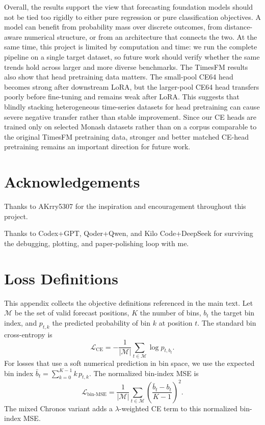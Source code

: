 \documentclass{article}
\begin{document}
Overall, the results support the view that forecasting foundation models should
not be tied too rigidly to either pure regression or pure classification
objectives.  A model can benefit from probability mass over discrete outcomes,
from distance-aware numerical structure, or from an architecture that connects
the two.  At the same time, this project is limited by computation and time: we
run the complete pipeline on a single target dataset, so future work should
verify whether the same trends hold across larger and more diverse benchmarks.
The TimesFM results also show that head pretraining data matters.  The
small-pool CE64 head becomes strong after downstream LoRA, but the larger-pool
CE64 head transfers poorly before fine-tuning and remains weak after LoRA.  This
suggests that blindly stacking heterogeneous time-series datasets for head
pretraining can cause severe negative transfer rather than stable improvement.
Since our CE heads are trained only on selected Monash datasets rather than on a
corpus comparable to the original TimesFM pretraining data, stronger and better
matched CE-head pretraining remains an important direction for future work.

\section*{Acknowledgements}

Thanks to AKrry5307 for the inspiration and encouragement throughout this
project.

Thanks to Codex+GPT, Qoder+Qwen, and Kilo Code+DeepSeek for surviving the
debugging, plotting, and paper-polishing loop with me.

\medskip






\appendix

\section{Loss Definitions}
\label{app:loss-definitions}

This appendix collects the objective definitions referenced in the main text.
Let $\mathcal{M}$ be the set of valid forecast positions, $K$ the number of
bins, $b_t$ the target bin index, and $p_{t,k}$ the predicted probability of bin
$k$ at position $t$.  The standard bin cross-entropy is
\begin{equation}
    \mathcal{L}_{\mathrm{CE}}
    = -\frac{1}{|\mathcal{M}|}\sum_{t\in\mathcal{M}}\log p_{t,b_t}.
\end{equation}
For losses that use a soft numerical prediction in bin space, we use the
expected bin index $\bar{b}_t=\sum_{k=0}^{K-1}k\,p_{t,k}$.  The normalized
bin-index MSE is
\begin{equation}
    \mathcal{L}_{\mathrm{bin\text{-}MSE}}
    = \frac{1}{|\mathcal{M}|}\sum_{t\in\mathcal{M}}
      \left(\frac{\bar{b}_t-b_t}{K-1}\right)^2 .
\end{equation}
The mixed Chronos variant adds a $\lambda$-weighted CE term to this normalized
bin-index MSE.
\end{document}
